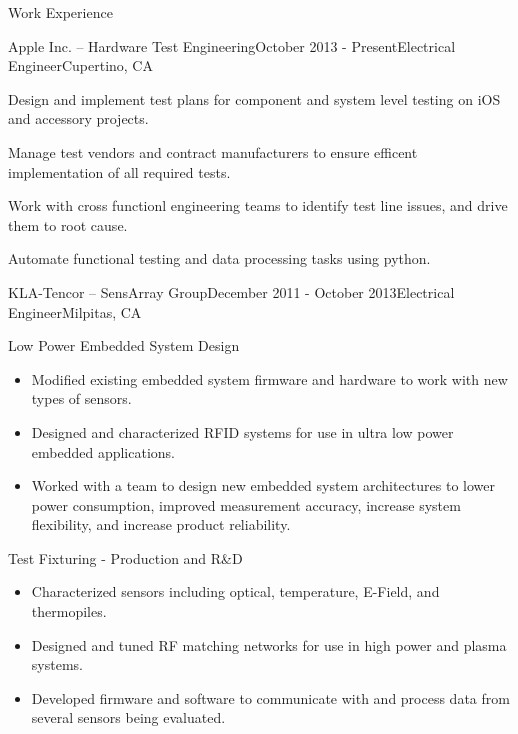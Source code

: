 \documentclass{resume} %
\begin{document}

\begin{rSection}{Work Experience}
\vspace{-0.5em}
\begin{rSubsection}{Apple Inc. -- Hardware Test Engineering}{October 2013 - Present}{Electrical Engineer}{Cupertino, CA}
\item Design and implement test plans for component and system level testing on iOS and accessory projects.
\item Manage test vendors and contract manufacturers to ensure efficent implementation of all required tests.
\item Work with cross functionl engineering teams to identify test line issues, and drive them to root cause.
\item Automate functional testing and data processing tasks using python.
\end{rSubsection}


\begin{rSubsection2}{KLA-Tencor -- SensArray Group}{December 2011 - October 2013}{Electrical Engineer}{Milpitas, CA}
\item Low Power Embedded System Design 
\begin{itemize}
\itemsep -0.5em \vspace{-0.5em}
\renewcommand{\labelitemi}{-}
\item Modified existing embedded system firmware and hardware to work with new types of sensors.
\item Designed and characterized RFID systems for use in ultra low power embedded applications.
\item Worked with a team to design new embedded system architectures to lower power consumption, improved measurement accuracy, increase system flexibility, and increase product reliability.
\end{itemize}

\item Test Fixturing - Production and R\&D
\begin{itemize}
\itemsep -0.5em \vspace{-0.5em}
\renewcommand{\labelitemi}{-}
\item Characterized sensors including optical, temperature, E-Field, and thermopiles.
\item Designed and tuned RF matching networks for use in high power and plasma systems.
\item Developed firmware and software to communicate with and process data from several sensors being evaluated.
\end{itemize}
\end{rSubsection2}


\end{rSection}
\end{document}
